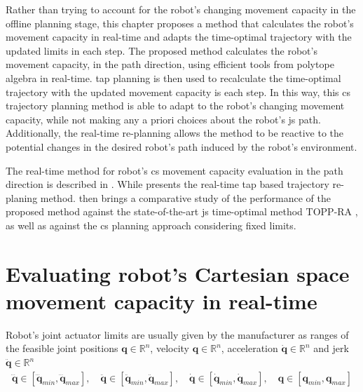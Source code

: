 Rather than trying to account for the robot's changing movement capacity in the offline planning stage, this chapter proposes a method that calculates the robot's movement capacity in real-time and adapts the time-optimal trajectory with the updated limits in each step. 
The proposed method calculates the robot's movement capacity, in the path direction, using efficient tools from polytope algebra in real-time. \gls{tap} planning is then used to recalculate the time-optimal trajectory with the updated movement capacity is each step.
In this way, this \gls{cs} trajectory planning method is able to adapt to the robot's changing movement capacity, while not making any a priori choices about the robot's \gls{js} path. Additionally, the real-time re-planning allows the method to be reactive to the potential changes in the desired robot's path induced by the robot's environment.

The real-time method for robot's \gls{cs} movement capacity evaluation in the path direction is described in . While  presents the real-time \gls{tap} based trajectory re-planing method. 
 then brings a comparative study of the performance of the proposed method against the state-of-the-art \gls{js} time-optimal method TOPP-RA \cite{Pham2018}, as well as against the \gls{cs} planning approach considering fixed limits.


\section{Evaluating robot's Cartesian space movement capacity in real-time}
\label{ch:capacity}

Robot's joint actuator limits are usually given by the manufacturer as ranges of the feasible joint positions $\bm{q}\in\mathbb{R}^n$, velocity $\bm{q}\in\mathbb{R}^n$, acceleration $\dot{\bm{q}}\in\mathbb{R}^n$ and jerk $\ddot{\bm{q}}\in\mathbb{R}^n$
\begin{equation}
\begin{split}
\dddot{\bm{q}} \in [ \dddot{\bm{q}}_{min}, \dddot{\bm{q}}_{max}] , \quad\ddot{\bm{q}} \in [\ddot{\bm{q}}_{min},  \ddot{\bm{q}}_{max}],\quad
\dot{\bm{q}} \in [\dot{\bm{q}}_{min},  \dot{\bm{q}}_{max}], \quad{\bm{q}} \in [{\bm{q}}_{min},  {\bm{q}}_{max}]
\end{split}
\label{eq:topca_kin_limits}
\end{equation}

